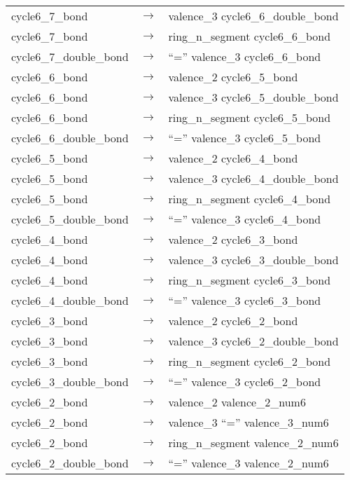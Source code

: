 \documentclass[../Document.tex]{subfiles}
\begin{document}
\begin{longtable}{m{} p{} p{}}
    cycle6\_7\_bond & $\rightarrow$ & valence\_3 cycle6\_6\_double\_bond \\
    cycle6\_7\_bond & $\rightarrow$ & ring\_n\_segment cycle6\_6\_bond \\
    cycle6\_7\_double\_bond & $\rightarrow$ & ``='' valence\_3 cycle6\_6\_bond \\
    cycle6\_6\_bond & $\rightarrow$ & valence\_2 cycle6\_5\_bond \\
    cycle6\_6\_bond & $\rightarrow$ & valence\_3 cycle6\_5\_double\_bond \\
    cycle6\_6\_bond & $\rightarrow$ & ring\_n\_segment cycle6\_5\_bond \\
    cycle6\_6\_double\_bond & $\rightarrow$ & ``='' valence\_3 cycle6\_5\_bond \\
    cycle6\_5\_bond & $\rightarrow$ & valence\_2 cycle6\_4\_bond \\
    cycle6\_5\_bond & $\rightarrow$ & valence\_3 cycle6\_4\_double\_bond \\
    cycle6\_5\_bond & $\rightarrow$ & ring\_n\_segment cycle6\_4\_bond \\
    cycle6\_5\_double\_bond & $\rightarrow$ & ``='' valence\_3 cycle6\_4\_bond \\
    cycle6\_4\_bond & $\rightarrow$ & valence\_2 cycle6\_3\_bond \\
    cycle6\_4\_bond & $\rightarrow$ & valence\_3 cycle6\_3\_double\_bond \\
    cycle6\_4\_bond & $\rightarrow$ & ring\_n\_segment cycle6\_3\_bond \\
    cycle6\_4\_double\_bond & $\rightarrow$ & ``='' valence\_3 cycle6\_3\_bond \\
    cycle6\_3\_bond & $\rightarrow$ & valence\_2 cycle6\_2\_bond \\
    cycle6\_3\_bond & $\rightarrow$ & valence\_3 cycle6\_2\_double\_bond \\
    cycle6\_3\_bond & $\rightarrow$ & ring\_n\_segment cycle6\_2\_bond \\
    cycle6\_3\_double\_bond & $\rightarrow$ & ``='' valence\_3 cycle6\_2\_bond \\
    cycle6\_2\_bond & $\rightarrow$ & valence\_2 valence\_2\_num6 \\
    cycle6\_2\_bond & $\rightarrow$ & valence\_3 ``='' valence\_3\_num6 \\
    cycle6\_2\_bond & $\rightarrow$ & ring\_n\_segment valence\_2\_num6 \\
    cycle6\_2\_double\_bond & $\rightarrow$ & ``='' valence\_3 valence\_2\_num6 \\

\end{longtable}
\end{document}
